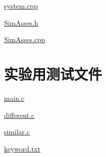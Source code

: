 \documentclass[a4paper]{article}
\begin{document}
	\href{../exp6/system.cpp.txt}{\underline{system.cpp}}

	\href{../exp6/SimAsses.h.txt}{\underline{SimAsses.h}}

	\href{../exp6/SimAsses.cpp.txt}{\underline{SimAsses.cpp}}


	\section{实验用测试文件}\label{sec:appendix2}
	\href{../exp6/file/main.c.txt}{\underline{main.c}}

	\href{../exp6/file/different.c.txt}{\underline{different.c}}

	\href{../exp6/file/similar.c.txt}{\underline{similar.c}}

	\href{../exp6/file/keyword.txt}{\underline{keyword.txt}}
\end{document}
